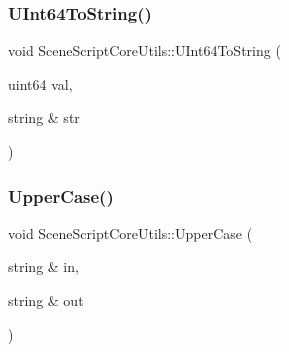 \hypertarget{class_scene_script_core_utils_a7d31b445a6247eea0adac3473a4691df}{}\label{class_scene_script_core_utils_a7d31b445a6247eea0adac3473a4691df} 
\subsubsection{\texorpdfstring{U\+Int64\+To\+String()}{UInt64ToString()}}
{\footnotesize\ttfamily void Scene\+Script\+Core\+Utils\+::\+U\+Int64\+To\+String (\begin{DoxyParamCaption}\item[{uint64}]{val,  }\item[{string \&}]{str }\end{DoxyParamCaption})}

\hypertarget{class_scene_script_core_utils_ab561c8dad7dd36ecb08f60c06ef021cb}{}\label{class_scene_script_core_utils_ab561c8dad7dd36ecb08f60c06ef021cb} 
\subsubsection{\texorpdfstring{Upper\+Case()}{UpperCase()}}
{\footnotesize\ttfamily void Scene\+Script\+Core\+Utils\+::\+Upper\+Case (\begin{DoxyParamCaption}\item[{string \&}]{in,  }\item[{string \&}]{out }\end{DoxyParamCaption})}

